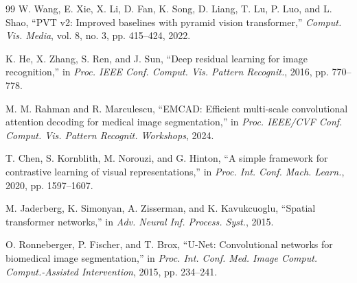 \documentclass[journal]{IEEEtran}
\begin{document}
\begin{thebibliography}{99}
W. Wang, E. Xie, X. Li, D. Fan, K. Song, D. Liang, T. Lu, P. Luo, and L. Shao, ``PVT v2: Improved baselines with pyramid vision transformer,'' \emph{Comput. Vis. Media}, vol. 8, no. 3, pp. 415--424, 2022.

K. He, X. Zhang, S. Ren, and J. Sun, ``Deep residual learning for image recognition,'' in \emph{Proc. IEEE Conf. Comput. Vis. Pattern Recognit.}, 2016, pp. 770--778.

M. M. Rahman and R. Marculescu, ``EMCAD: Efficient multi-scale convolutional attention decoding for medical image segmentation,'' in \emph{Proc. IEEE/CVF Conf. Comput. Vis. Pattern Recognit. Workshops}, 2024.

T. Chen, S. Kornblith, M. Norouzi, and G. Hinton, ``A simple framework for contrastive learning of visual representations,'' in \emph{Proc. Int. Conf. Mach. Learn.}, 2020, pp. 1597--1607.

M. Jaderberg, K. Simonyan, A. Zisserman, and K. Kavukcuoglu, ``Spatial transformer networks,'' in \emph{Adv. Neural Inf. Process. Syst.}, 2015.

O. Ronneberger, P. Fischer, and T. Brox, ``U-Net: Convolutional networks for biomedical image segmentation,'' in \emph{Proc. Int. Conf. Med. Image Comput. Comput.-Assisted Intervention}, 2015, pp. 234--241.
\end{thebibliography}
\end{document}
